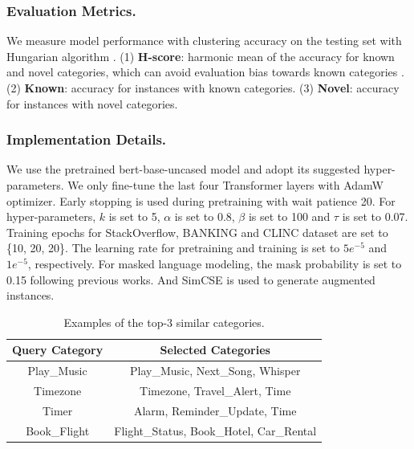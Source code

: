 \documentclass[letterpaper]{article} %
\begin{document}
\subsubsection{Evaluation Metrics.}
We measure model performance with clustering accuracy on the testing set with Hungarian algorithm \citep{hungarian}.
(1) \textbf{H-score}: harmonic mean of the accuracy for known and novel categories, which can avoid evaluation bias towards known categories \citep{hscore}.
(2) \textbf{Known}: accuracy for instances with known categories.
(3) \textbf{Novel}: accuracy for instances with novel categories.





















\subsubsection{Implementation Details.}
We use the pretrained bert-base-uncased model \citep{huggingface} and adopt its suggested hyper-parameters. We only fine-tune the last four Transformer layers with AdamW optimizer. 
Early stopping is used during pretraining with wait patience 20. 
For hyper-parameters, $k$ is set to 5, $\alpha$ is set to 0.8, $\beta$ is set to 100 and $\tau$ is set to 0.07. 
Training epochs for StackOverflow, BANKING and CLINC dataset are set to \{10, 20, 20\}. The learning rate for pretraining and training is set to $5e^{-5}$ and $1e^{-5}$, respectively.
For masked language modeling, the mask probability is set to 0.15 following previous works. And SimCSE \citep{simcse} is used to generate augmented instances.




\begin{table}
\setlength\tabcolsep{4pt}
\centering
\begin{tabular}{cc}
\toprule
\textbf{Query Category}    & \textbf{Selected Categories} \\
\midrule  
Play\_Music &Play\_Music, Next\_Song, Whisper \\
Timezone & Timezone, Travel\_Alert, Time \\
\midrule
Timer & Alarm, Reminder\_Update, Time \\
Book\_Flight & Flight\_Status, Book\_Hotel, Car\_Rental \\
\bottomrule

\end{tabular}
\caption{Examples of the top-3 similar categories.}
\label{table3}
\end{table}
\end{document}
